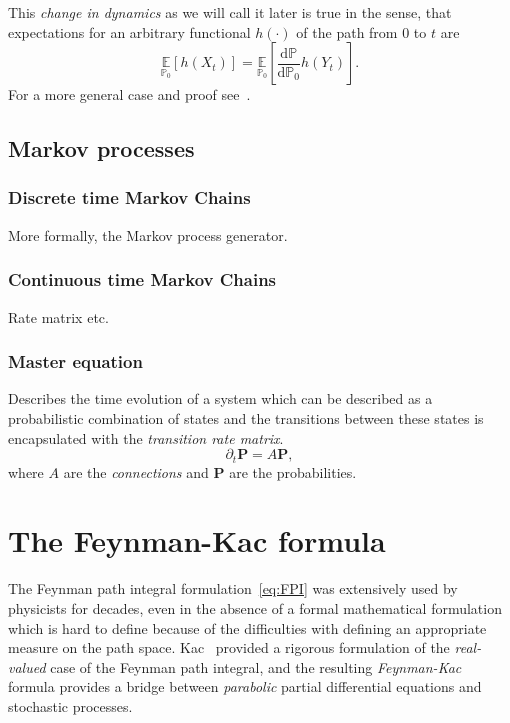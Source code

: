 This \emph{change in dynamics} as we will call it later is true in the sense, that expectations for an arbitrary functional $h(\cdot)$ of the path from $0$ to $t$ are
\begin{equation}
	\label{eq:girsanov_consequence}
	\underset{\mathbb{P}_0}{\mathbb{E}}\left[h(X_t)\right] = \underset{\mathbb{P}_0}{\mathbb{E}}\left[\frac{\mathrm{d} \mathbb{P}}{\mathrm{d} \mathbb{P}_0} h(Y_t)\right]. 
\end{equation}
For a more general case and proof see~\cite{sarkka2019applied}.

\subsection{Markov processes}

\subsubsection{Discrete time Markov Chains}
More formally, the Markov process generator.

\subsubsection{Continuous time Markov Chains}
Rate matrix etc.

\subsubsection{Master equation}
Describes the time evolution of a system which can be described as a probabilistic combination of states and the transitions between these states is encapsulated with the \emph{transition rate matrix}.
\begin{equation}
	\partial_{t} \mathbf{P} = A \mathbf{P},
\end{equation}
where $A$ are the \emph{connections} and $\mathbf{P}$ are the probabilities.  

\section{The Feynman-Kac formula}
\label{subsec:fk-fk}
The Feynman path integral formulation~\eqref{eq:FPI} was extensively used by physicists for decades, even in the absence of a formal mathematical formulation which is hard to define because of the difficulties with defining an appropriate measure on the path space. Kac~\cite{kac1949distributions} provided a rigorous formulation of the \textit{real-valued} case of the Feynman path integral, and the resulting \emph{Feynman-Kac} formula provides a bridge between \emph{parabolic} partial differential equations and stochastic processes.


